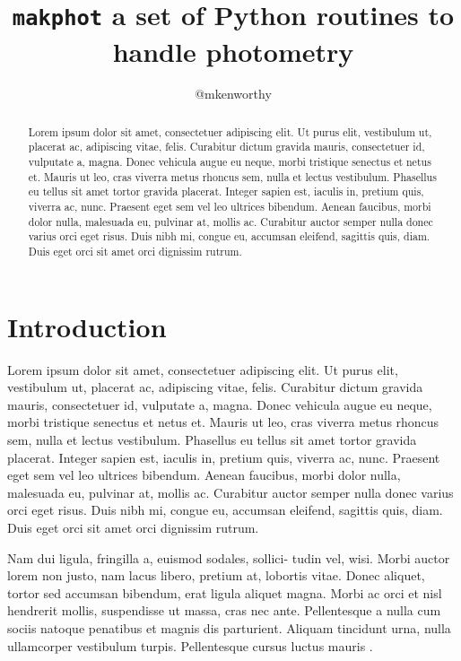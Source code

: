 \documentclass[twocolumn]{aastex631}
\begin{document}
\title{\texttt{makphot} a set of Python routines to handle photometry}

\author{@mkenworthy}

\begin{abstract}
    Lorem ipsum dolor sit amet, consectetuer adipiscing elit.
    Ut purus elit, vestibulum ut, placerat ac, adipiscing vitae, felis.
    Curabitur dictum gravida mauris, consectetuer id, vulputate a, magna.
    Donec vehicula augue eu neque, morbi tristique senectus et netus et.
    Mauris ut leo, cras viverra metus rhoncus sem, nulla et lectus vestibulum.
    Phasellus eu tellus sit amet tortor gravida placerat.
    Integer sapien est, iaculis in, pretium quis, viverra ac, nunc.
    Praesent eget sem vel leo ultrices bibendum.
    Aenean faucibus, morbi dolor nulla, malesuada eu, pulvinar at, mollis ac.
    Curabitur auctor semper nulla donec varius orci eget risus.
    Duis nibh mi, congue eu, accumsan eleifend, sagittis quis, diam.
    Duis eget orci sit amet orci dignissim rutrum.
\end{abstract}

\section{Introduction}
\label{sec:intro}

Lorem ipsum dolor sit amet, consectetuer adipiscing elit.
Ut purus elit, vestibulum ut, placerat ac, adipiscing vitae, felis.
Curabitur dictum gravida mauris, consectetuer id, vulputate a, magna.
Donec vehicula augue eu neque, morbi tristique senectus et netus et.
Mauris ut leo, cras viverra metus rhoncus sem, nulla et lectus vestibulum.
Phasellus eu tellus sit amet tortor gravida placerat.
Integer sapien est, iaculis in, pretium quis, viverra ac, nunc.
Praesent eget sem vel leo ultrices bibendum.
Aenean faucibus, morbi dolor nulla, malesuada eu, pulvinar at, mollis ac.
Curabitur auctor semper nulla donec varius orci eget risus.
Duis nibh mi, congue eu, accumsan eleifend, sagittis quis, diam.
Duis eget orci sit amet orci dignissim rutrum.

Nam dui ligula, fringilla a, euismod sodales, sollici- tudin vel, wisi.
Morbi auctor lorem non justo, nam lacus libero, pretium at, lobortis vitae.
Donec aliquet, tortor sed accumsan bibendum, erat ligula aliquet magna.
Morbi ac orci et nisl hendrerit mollis, suspendisse ut massa, cras nec ante.
Pellentesque a nulla cum sociis natoque penatibus et magnis dis parturient.
Aliquam tincidunt urna, nulla ullamcorper vestibulum turpis.
Pellentesque cursus luctus mauris \citep{Luger2021}.


\end{document}
